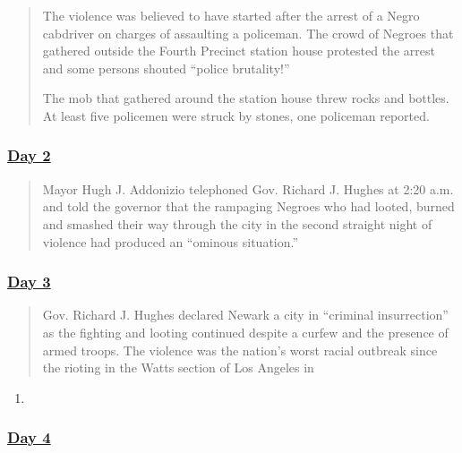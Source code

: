 \begin{quote}
The violence was believed to have started after the arrest of a Negro
cabdriver on charges of assaulting a policeman. The crowd of Negroes
that gathered outside the Fourth Precinct station house protested the
arrest and some persons shouted ``police brutality!''

The mob that gathered around the station house threw rocks and bottles.
At least five policemen were struck by stones, one policeman reported.
\end{quote}

\hypertarget{day-2}{%
\subsubsection{\texorpdfstring{\href{https://timesmachine.nytimes.com/timesmachine/1967/07/14/83616047.html?pageNumber=1}{Day
2}}{Day 2}}\label{day-2}}

\begin{quote}
Mayor Hugh J. Addonizio telephoned Gov. Richard J. Hughes at 2:20 a.m.
and told the governor that the rampaging Negroes who had looted, burned
and smashed their way through the city in the second straight night of
violence had produced an ``ominous situation.''
\end{quote}

\hypertarget{day-3}{%
\subsubsection{\texorpdfstring{\href{https://timesmachine.nytimes.com/timesmachine/1967/07/15/83616900.html?pageNumber=1}{Day
3}}{Day 3}}\label{day-3}}

\begin{quote}
Gov. Richard J. Hughes declared Newark a city in ``criminal
insurrection'' as the fighting and looting continued despite a curfew
and the presence of armed troops. The violence was the nation's worst
racial outbreak since the rioting in the Watts section of Los Angeles in
\end{quote}

\begin{enumerate}
\def\labelenumi{\arabic{enumi}.}
\setcounter{enumi}{1964}
\item
\end{enumerate}

\hypertarget{day-4}{%
\subsubsection{\texorpdfstring{\href{https://timesmachine.nytimes.com/timesmachine/1967/07/16/83617964.html?pageNumber=1}{Day
4}}{Day 4}}\label{day-4}}

